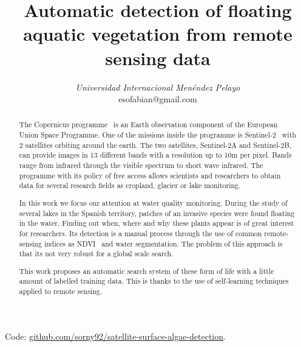 \documentclass[conference]{IEEEtran}
\begin{document}
    \title{Automatic detection of floating aquatic vegetation from remote sensing data}

    \author{
    \textit{Universidad Internacional Menéndez Pelayo}\\
    esofabian@gmail.com}

    \maketitle

    \begin{abstract}
        The Copernicus programme~\cite{whatiscopernicus} is an Earth observation component of the European Union Space
        Programme.
        One of the missions inside the programme is Sentinel-2~\cite{sentinel-2} with 2 satellites orbiting around the
        earth.
        The two satellites, Sentinel-2A and Sentinel-2B, can provide images in 13 different bands with a resolution up
        to 10m per pixel.
        Bands range from infrared through the visible spectrum to short wave infrared.
        The programme with its policy of free access allows scientists and researchers to obtain data for several
        research fields as cropland, glacier or lake monitoring.

        In this work we focus our attention at water quality monitoring.
        During the study of several lakes in the Spanish territory, patches of an invasive species were found floating in the water.
        Finding out when, where and why these plants appear is of great interest for researchers.
        Its detection is a manual process through the use of common remote-sensing indices as NDVI~\cite{NDVIsource}
        and water segmentation.
        The problem of this approach is that its not very robust for a global scale search.

        This work proposes an automatic search system of these form of life with a little amount of labelled training data.
        This is thanks to the use of self-learning techniques applied to remote sensing.
    \end{abstract}
    \newline
    Code: \href{https://github.com/sorny92/satellite-surface-algae-detection}{github.com/sorny92/satellite-surface-algae-detection}.
    \newline
\end{document}
